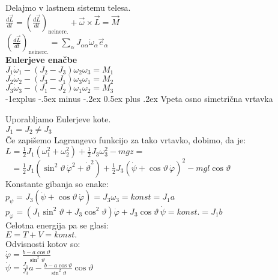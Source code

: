 \documentclass[12pt,landscape]{article}
\makeatletter
\renewcommand{\subsection}{\@startsection{subsection}{2}{0mm}%
                                {-1explus -.5ex minus -.2ex}%
                                {0.5ex plus .2ex}%
                                {\normalfont\normalsize\bfseries}}
\makeatother
\begin{document}
\begin{multicols}{3}
Delajmo v lastnem sistemu telesa. \\
$\frac{d \vec L}{dt} = \left( \frac{d \vec L}{dt} \right)_\mathrm{neinerc.} + \vec \omega \times \vec L = \vec M$ \\
$\left( \frac{d \vec L}{dt} \right)_\mathrm{neinerc.} = \sum_\alpha J_{\alpha \alpha} \dot \omega_\alpha \vec e_\alpha$ \medskip \\

\textbf{Eulerjeve enačbe} \\
$J_1 \dot \omega_1 - (J_2 - J_3) \omega_2 \omega_3 = M_1$ \\
$J_2 \dot \omega_2 - (J_3 - J_1) \omega_3 \omega_1 = M_2$ \\
$J_3 \dot \omega_3 - (J_1 - J_2) \omega_1 \omega_2 = M_3$ \medskip \\


\subsection{Vpeta osno simetrična vrtavka}

Uporabljamo Eulerjeve kote. \\
$J_1 = J_2 \neq J_3$ \medskip \\
Če zapišemo Lagrangevo funkcijo za tako vrtavko, dobimo, da je: \\
$L = \frac{1}{2}J_1(\omega_1^2 + \omega_2^2) + \frac{1}{2} J_3 \omega_3^2 - mgz = $\\
$\ \ \ = \frac{1}{2} J_1(\sin^2 \vartheta \, \dot \varphi^2 + \dot \vartheta^2) + \frac{1}{2}J_3(\dot \psi + \cos \vartheta \, \dot \varphi)^2 - mgl\cos \vartheta$ \medskip\\
Konstante gibanja so enake: \\
$p_\psi = J_3(\dot \psi + \cos \vartheta \, \dot \varphi) = J_3 \omega_3 = konst = J_1 a$ \\
$p_\varphi = (J_1 \sin^2 \vartheta + J_3 \cos^2 \vartheta) \dot \varphi + J_3 \cos \vartheta \, \dot \psi = konst. = J_1 b$ \medskip \\
Celotna energija pa se glasi: \\
$E = T + V = konst.$ \medskip \\

Odvisnosti kotov so: \\
$\dot \varphi = \frac{b - a\cos \vartheta}{\sin^2 \vartheta}$ \\
$\dot \psi = \frac{J_1}{J_3} a - \frac{b - a\cos \vartheta}{\sin^2 \vartheta} \cos \vartheta$ \medskip \\


\end{multicols}
\end{document}
